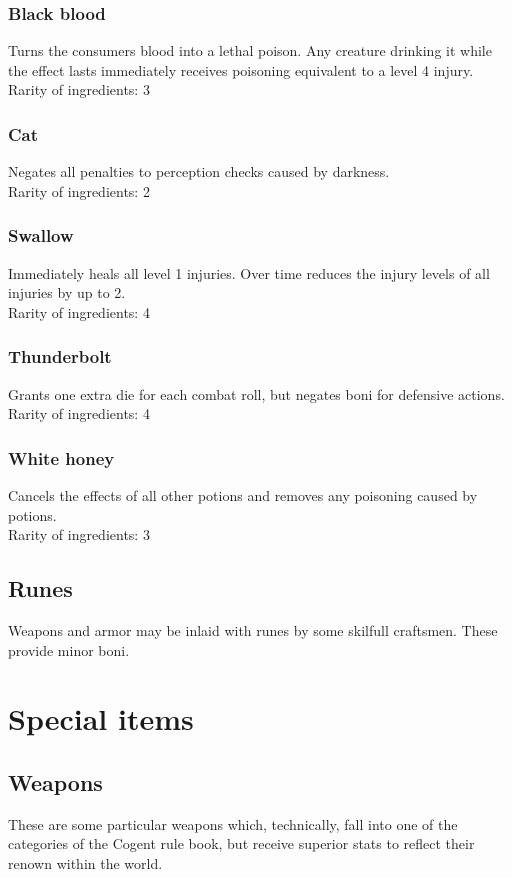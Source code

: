 \documentclass[parskip=full,11pt]{scrreport}
\begin{document}
\subsection{Black blood}
Turns the consumers blood into a lethal poison. Any creature drinking it while the effect lasts immediately receives
poisoning equivalent to a level 4 injury.
\\[2ex]
Rarity of ingredients: 3

\subsection{Cat}
Negates all penalties to perception checks caused by darkness.
\\[2ex]
Rarity of ingredients: 2

\subsection{Swallow}
Immediately heals all level 1 injuries. Over time reduces the injury levels of all injuries by up to 2.
\\[2ex]
Rarity of ingredients: 4

\subsection{Thunderbolt}
Grants one extra die for each combat roll, but negates boni for defensive actions.
\\[2ex]
Rarity of ingredients: 4

\subsection{White honey}
Cancels the effects of all other potions and removes any poisoning caused by potions.
\\[2ex]
Rarity of ingredients: 3

\section{Runes}
Weapons and armor may be inlaid with runes by some skilfull craftsmen. These provide minor boni.

\chapter{Special items}
\section{Weapons}
These are some particular weapons which, technically, fall into one of the categories of the Cogent rule book,
but receive superior stats to reflect their renown within the world.
\end{document}
